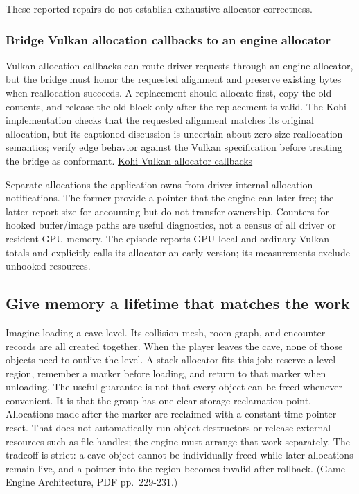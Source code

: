 These reported repairs do not establish exhaustive allocator correctness.

\subsubsection{Bridge Vulkan allocation callbacks to an engine allocator}\label{05-engine-i-ch014-bridge-vulkan-allocation-callbacks-to-an-engine-allocator}

Vulkan allocation callbacks can route driver requests through an engine allocator, but the bridge must honor the requested alignment and preserve existing bytes when reallocation succeeds. A replacement should allocate first, copy the old contents, and release the old block only after the replacement is valid. The Kohi implementation checks that the requested alignment matches its original allocation, but its captioned discussion is uncertain about zero-size reallocation semantics; verify edge behavior against the Vulkan specification before treating the bridge as conformant. \href{https://www.youtube.com/watch?v=F9hN1PrxnHE}{Kohi Vulkan allocator callbacks}

Separate allocations the application owns from driver-internal allocation notifications. The former provide a pointer that the engine can later free; the latter report size for accounting but do not transfer ownership. Counters for hooked buffer/image paths are useful diagnostics, not a census of all driver or resident GPU memory. The episode reports GPU-local and ordinary Vulkan totals and explicitly calls its allocator an early version; its measurements exclude unhooked resources.

\subsection{Give memory a lifetime that matches the work}\label{05-engine-i-ch014-give-memory-a-lifetime-that-matches-the-work}

Imagine loading a cave level. Its collision mesh, room graph, and encounter records are all created together. When the player leaves the cave, none of those objects need to outlive the level. A stack allocator fits this job: reserve a level region, remember a marker before loading, and return to that marker when unloading. The useful guarantee is not that every object can be freed whenever convenient. It is that the group has one clear storage-reclamation point. Allocations made after the marker are reclaimed with a constant-time pointer reset. That does not automatically run object destructors or release external resources such as file handles; the engine must arrange that work separately. The tradeoff is strict: a cave object cannot be individually freed while later allocations remain live, and a pointer into the region becomes invalid after rollback. (Game Engine Architecture, PDF pp.~229-231.)

